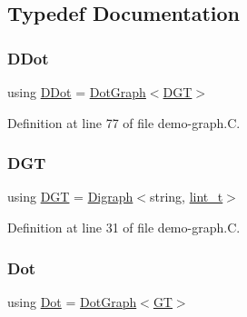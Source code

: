 \subsection{Typedef Documentation}
\mbox{\label{demo-graph_8_c_a0ffdd103a7285712ccbd9548ff5544e7}} 
\subsubsection{\texorpdfstring{D\+Dot}{DDot}}
{\footnotesize\ttfamily using \hyperlink{demo-buildgraph_8_c_a0ffdd103a7285712ccbd9548ff5544e7}{D\+Dot} =  \hyperlink{class_designar_1_1_dot_graph}{Dot\+Graph}$<$\hyperlink{demo-buildgraph_8_c_ae73e956c2a8cf0a58255aa6b659985e0}{D\+GT}$>$}



Definition at line 77 of file demo-\/graph.\+C.

\mbox{\label{demo-graph_8_c_a6b9eddfa4274f215240c1c90be9df2dc}} 
\subsubsection{\texorpdfstring{D\+GT}{DGT}}
{\footnotesize\ttfamily using \hyperlink{demo-buildgraph_8_c_ae73e956c2a8cf0a58255aa6b659985e0}{D\+GT} =  \hyperlink{class_designar_1_1_digraph}{Digraph}$<$string, \hyperlink{namespace_designar_a9d113d66a39e82b73727c72cd3a52f73}{lint\+\_\+t}$>$}



Definition at line 31 of file demo-\/graph.\+C.

\mbox{\label{demo-graph_8_c_a70657b0b48a4d69ef850be3c5517ecc2}} 
\subsubsection{\texorpdfstring{Dot}{Dot}}
{\footnotesize\ttfamily using \hyperlink{demo-buildgraph_8_c_a70657b0b48a4d69ef850be3c5517ecc2}{Dot} =  \hyperlink{class_designar_1_1_dot_graph}{Dot\+Graph}$<$\hyperlink{demo-buildgraph_8_c_a3001c40d2c31ca87ed96cd7d1334a55e}{GT}$>$}



